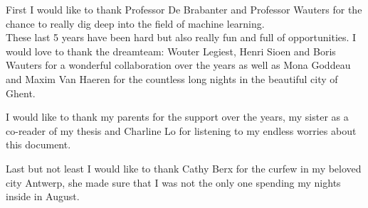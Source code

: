 First I would like to thank Professor De Brabanter and Professor Wauters for the chance to really dig deep into the field of machine learning.\\
These last 5 years have been hard but also really fun and full of opportunities.
I would love to thank the dreamteam: Wouter Legiest, Henri Sioen and Boris Wauters for a wonderful collaboration over the years as well as Mona Goddeau and Maxim Van Haeren for the countless long nights in the beautiful city of Ghent.\par 
I would like to thank my parents for the support over the years, my sister as a co-reader of my thesis and Charline Lo for listening to my endless worries about this document.\par 
Last but not least I would like to thank Cathy Berx for the curfew in my beloved city Antwerp, she made sure that I was not the only one spending my nights inside in August.

